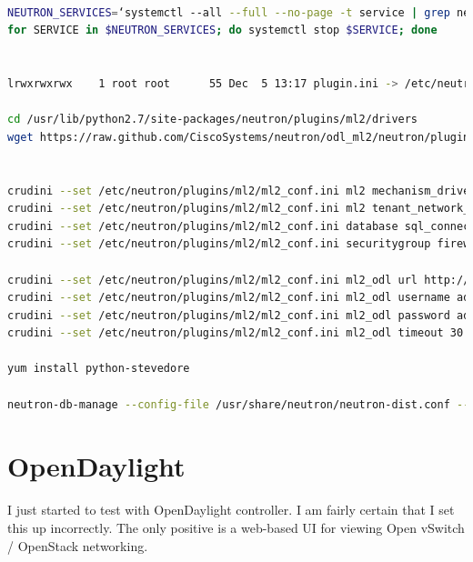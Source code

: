 \documentclass[11pt,letterpaper,oneside]{book}
\begin{document}
\begin{lstlisting}[caption={Install Oracle Java JDK},language=bash]

NEUTRON_SERVICES=‘systemctl --all --full --no-page -t service | grep neutron | awk ’{print $1}’‘
for SERVICE in $NEUTRON_SERVICES; do systemctl stop $SERVICE; done


lrwxrwxrwx    1 root root      55 Dec  5 13:17 plugin.ini -> /etc/neutron/plugins/openvswitch/ovs_neutron_plugin.ini

cd /usr/lib/python2.7/site-packages/neutron/plugins/ml2/drivers
wget https://raw.github.com/CiscoSystems/neutron/odl_ml2/neutron/plugins/ml2/drivers/mechanism_odl.py


crudini --set /etc/neutron/plugins/ml2/ml2_conf.ini ml2 mechanism_drivers opendaylight,logger
crudini --set /etc/neutron/plugins/ml2/ml2_conf.ini ml2 tenant_network_types gre,vxlan
crudini --set /etc/neutron/plugins/ml2/ml2_conf.ini database sql_connection mysql://neutron:a5ae99f4d7304966@10.53.253.90/neutron_ml2
crudini --set /etc/neutron/plugins/ml2/ml2_conf.ini securitygroup firewall_driver dummy_value_to_enable_security_groups_in_server

crudini --set /etc/neutron/plugins/ml2/ml2_conf.ini ml2_odl url http://10.53.251.200:8080/controller/nb/v2/neutron
crudini --set /etc/neutron/plugins/ml2/ml2_conf.ini ml2_odl username admin
crudini --set /etc/neutron/plugins/ml2/ml2_conf.ini ml2_odl password admin
crudini --set /etc/neutron/plugins/ml2/ml2_conf.ini ml2_odl timeout 30

yum install python-stevedore

neutron-db-manage --config-file /usr/share/neutron/neutron-dist.conf --config-file /etc/neutron/neutron.conf --config-file /etc/neutron/plugin.ini upgrade head


\end{lstlisting}





\section{OpenDaylight}
I just started to test with OpenDaylight controller.  I am fairly certain that I set this up incorrectly.  The only positive is a web-based UI for viewing Open vSwitch / OpenStack networking.
\end{document}
